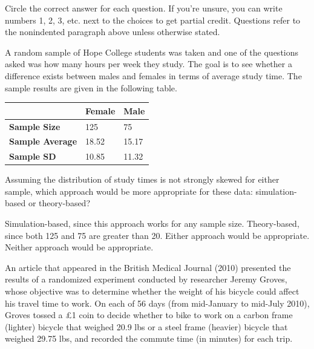 \documentclass{article}
\begin{document}
	Circle the correct answer for each question.  If you're unsure, you can write numbers 1, 2, 3, etc. next to the choices to get partial credit.  Questions refer to the nonindented paragraph above unless otherwise stated.\\[.5cm]
	
	\begin{mcquestions}
		\begin{mcquestioninstruction}
			A random sample of Hope College students was taken and one of the questions asked was how many hours per week they study.  The goal is to see whether a difference exists between males and females in terms of average study time.  The sample results are given in the following table.
			\begin{center}
				\begin{tabular}{| l | l | l |}
					\hline
					& \textbf{Female} & \textbf{Male} \\
					\hline
					\textbf{Sample Size} & 125 & 75 \\
					\hline
					\textbf{Sample Average} & 18.52 & 15.17 \\
					\hline
					\textbf{Sample SD} & 10.85 & 11.32 \\
					\hline
				\end{tabular}
			\end{center}
		\end{mcquestioninstruction}
		
		\question Assuming the distribution of study times is not strongly skewed for either sample, which approach would be more appropriate for these data: simulation-based or theory-based?
		\begin{mcanswerslist}
			\answer Simulation-based, since this approach works for any sample size.
			\answer Theory-based, since both 125 and 75 are greater than 20.
			\answer[correct] Either approach would be appropriate.
			\answer Neither approach would be appropriate.
		\end{mcanswerslist}
		
		\begin{mcquestioninstruction}
			An article that appeared in the British Medical Journal (2010) presented the results of a randomized experiment conducted by researcher Jeremy Groves, whose objective was to determine whether the weight of his bicycle could affect his travel time to work. On each of 56 days (from mid-January to mid-July 2010), Groves tossed a £1 coin to decide whether to bike to work on a carbon frame (lighter) bicycle that weighed 20.9 lbs or a steel frame (heavier) bicycle that weighed 29.75 lbs, and recorded the commute time (in minutes) for each trip.
			

\end{mcquestioninstruction}
\end{mcquestions}
\end{document}
